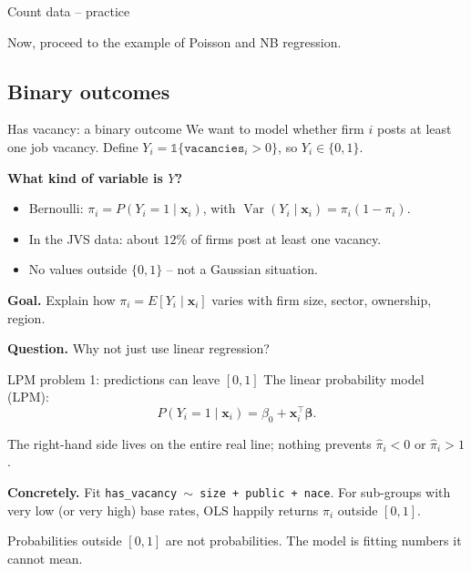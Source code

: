 \documentclass[10pt,ignorenonframetext,aspectratio=169]{beamer}
\newcommand{\bbeta}{\boldsymbol{\beta}}
\begin{document}
\begin{frame}{Count data -- practice}

\begin{center}
Now, proceed to the example of Poisson and NB regression. 
\end{center}


\end{frame}

\subsection{Binary outcomes}

\begin{frame}{Has vacancy: a binary outcome}
We want to model whether firm $i$ posts at least one job vacancy.
Define $Y_i = \mathbb{1}\{\texttt{vacancies}_i > 0\}$, so $Y_i \in \{0, 1\}$.

\medskip
\textbf{What kind of variable is $Y$?}
\begin{itemize}
    \justifying
    \item Bernoulli: $\pi_i = P(Y_i = 1 \mid \mathbf{x}_i)$, with $\operatorname{Var}(Y_i \mid \mathbf{x}_i) = \pi_i(1-\pi_i)$.
    \item In the JVS data: about $12\%$ of firms post at least one vacancy.
    \item No values outside $\{0,1\}$ -- not a Gaussian situation.
\end{itemize}

\medskip
\textbf{Goal.} Explain how $\pi_i = E[Y_i \mid \mathbf{x}_i]$ varies with firm size, sector, ownership, region.

\medskip
\textbf{Question.} Why not just use linear regression?
\end{frame}


\begin{frame}{LPM problem 1: predictions can leave $[0,1]$}
The linear probability model (LPM):
\[
P(Y_i = 1 \mid \mathbf{x}_i) = \beta_0 + \mathbf{x}_i^\top\bbeta.
\]

\medskip
The right-hand side lives on the entire real line; nothing prevents $\hat{\pi}_i < 0$ or $\hat{\pi}_i > 1$.

\medskip
\textbf{Concretely.} Fit \texttt{has\_vacancy $\sim$ size + public + nace}. For sub-groups with very low (or very high) base rates, OLS happily returns $\hat{\pi}_i$ outside $[0,1]$.

\medskip
\alert{Probabilities outside $[0,1]$ are not probabilities.} The model is fitting numbers it cannot mean.
\end{frame}
\end{document}

